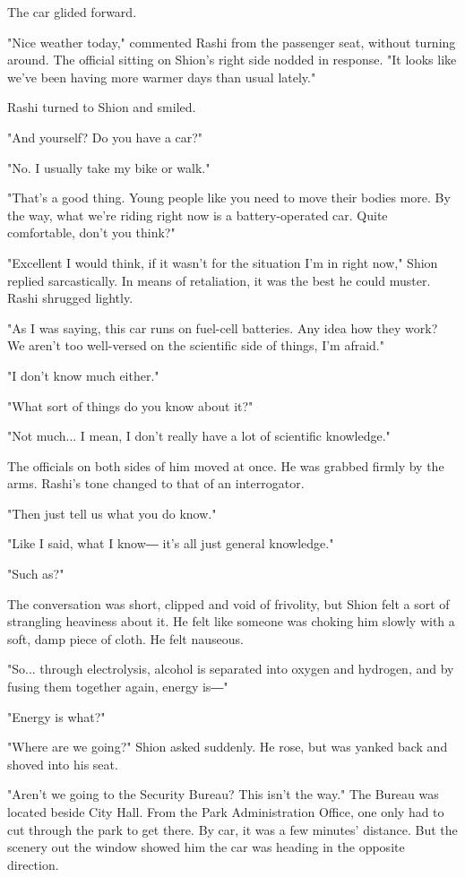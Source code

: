 \myspace

The car glided forward.~

"Nice weather today," commented Rashi from the passenger seat, without
turning around. The official sitting on Shion's right side nodded in
response. "It looks like we've been having more warmer days than usual
lately."

Rashi turned to Shion and smiled.

"And yourself? Do you have a car?"

"No. I usually take my bike or walk."

"That's a good thing. Young people like you need to move their bodies
more. By the way, what we're riding right now is a battery-operated car.
Quite comfortable, don't you think?"

"Excellent I would think, if it wasn't for the situation I'm in right
now," Shion replied sarcastically. In means of retaliation, it was the
best he could muster. Rashi shrugged lightly.

"As I was saying, this car runs on fuel-cell batteries. Any idea how
they work? We aren't too well-versed on the scientific side of things,
I'm afraid."

"I don't know much either."

"What sort of things do you know about it?"

"Not much... I mean, I don't really have a lot of scientific knowledge."

The officials on both sides of him moved at once. He was grabbed firmly
by the arms. Rashi's tone changed to that of an interrogator.

"Then just tell us what you do know."

"Like I said, what I know― it's all just general knowledge."

"Such as?"

The conversation was short, clipped and void of frivolity, but Shion
felt a sort of strangling heaviness about it. He felt like someone was
choking him slowly with a soft, damp piece of cloth. He felt nauseous.

"So... through electrolysis, alcohol is separated into oxygen and
hydrogen, and by fusing them together again, energy is―"

"Energy is what?"

"Where are we going?" Shion asked suddenly. He rose, but was yanked back
and shoved into his seat.

"Aren't we going to the Security Bureau? This isn't the way." The Bureau
was located beside City Hall. From the Park Administration Office, one
only had to cut through the park to get there. By car, it was a few
minutes' distance. But the scenery out the window showed him the car was
heading in the opposite direction.

